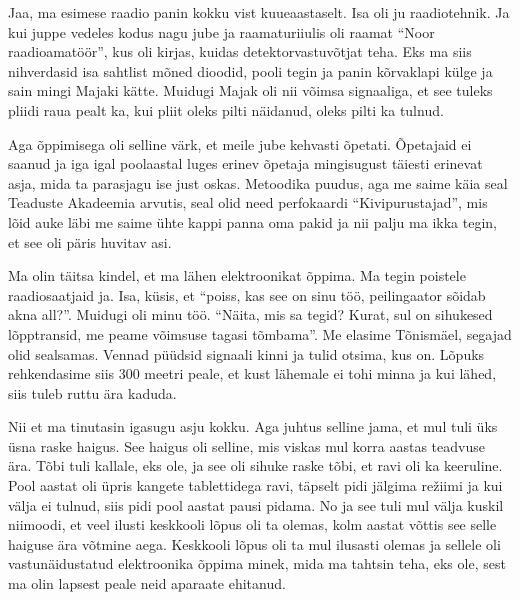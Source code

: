 
Jaa, ma esimese raadio panin kokku vist kuueaastaselt. Isa oli ju raadiotehnik. Ja kui juppe vedeles kodus nagu jube ja raamaturiiulis oli raamat \enquote{Noor raadioamatöör}, kus oli kirjas, kuidas detektorvastuvõtjat teha. Eks ma siis nihverdasid isa sahtlist mõned dioodid, pooli tegin ja panin kõrvaklapi külge ja sain mingi Majaki kätte. Muidugi Majak oli nii võimsa signaaliga, et see tuleks pliidi raua pealt ka, kui pliit oleks pilti näidanud, oleks pilti ka tulnud. 

Aga õppimisega oli selline värk, et meile jube kehvasti õpetati. Õpetajaid ei saanud ja iga igal poolaastal luges erinev õpetaja mingisugust täiesti erinevat asja, mida ta parasjagu ise just oskas. Metoodika puudus, aga me saime käia seal Teaduste Akadeemia arvutis, seal olid need perfokaardi \enquote{Kivipurustajad}, mis lõid auke läbi me saime ühte kappi panna oma pakid ja nii palju ma ikka tegin, et see oli päris huvitav asi. 

Ma olin täitsa kindel, et ma lähen elektroonikat õppima. Ma tegin poistele raadiosaatjaid ja. Isa, küsis, et \enquote{poiss, kas see on sinu töö, peilingaator sõidab akna all?}. Muidugi oli minu töö. \enquote{Näita, mis sa tegid?  Kurat, sul on sihukesed lõpptransid, me peame võimsuse tagasi tõmbama}. Me elasime Tõnismäel, segajad olid sealsamas. Vennad püüdsid signaali kinni ja tulid otsima, kus on. Lõpuks rehkendasime siis 300 meetri peale, et kust lähemale ei tohi minna ja  kui lähed, siis tuleb ruttu ära kaduda. 

Nii et ma tinutasin igasugu asju kokku. Aga juhtus selline jama, et mul tuli üks üsna raske haigus. See haigus oli selline, mis viskas mul korra aastas teadvuse ära. Tõbi tuli kallale, eks ole, ja see oli sihuke raske tõbi, et ravi oli ka keeruline. Pool aastat oli üpris kangete tablettidega ravi, täpselt pidi jälgima režiimi ja kui välja ei tulnud, siis pidi pool aastat pausi pidama. No ja see tuli mul välja kuskil niimoodi, et veel ilusti keskkooli lõpus oli ta olemas, kolm aastat võttis see selle haiguse ära võtmine aega. Keskkooli lõpus oli ta mul ilusasti olemas ja sellele oli vastunäidustatud  elektroonika õppima minek, mida ma tahtsin teha, eks ole, sest ma olin lapsest peale neid aparaate ehitanud. 

